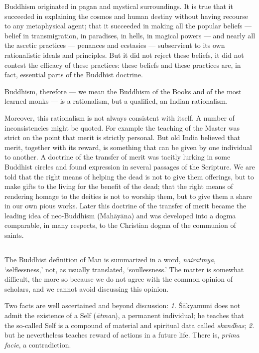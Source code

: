\documentclass[a4paper, 11pt, oneside, english]{article}
\begin{document}
Buddhism originated in pagan and mystical surroundings. It is true that it succeeded in explaining the cosmos and human destiny without having recourse to any metaphysical agent; that it succeeded in making all the popular beliefs --- belief in transmigration, in paradises, in hells, in magical powers --- and nearly all the ascetic practices --- penances and ecstasies --- subservient to its own rationalistic ideals and principles. But it did not reject these beliefs, it did not contest the efficacy of these practices: these beliefs and these practices are, in fact, essential parts of the Buddhist doctrine.

Buddhism, therefore --- we mean the Buddhism of the Books and of the most learned monks --- is a rationalism, but a qualified, an Indian rationalism.

Moreover, this rationalism is not always consistent with itself. A number of inconsistencies might be quoted. For example the teaching of the Master was strict on the point that merit is strictly personal. But old India believed that merit, together with its reward, is something that can be given by one individual to another. A doctrine of the transfer of merit was tacitly lurking in some Buddhist circles and found expression in several passages of the Scripture. We are told that the right means of helping the dead is not to give them offerings, but to make gifts to the living for the benefit of the dead; that the right means of rendering homage to the deities is not to worship them, but to give them a share in our own pious works. Later this doctrine of the transfer of merit became the leading idea of neo-Buddhism (Mahāyāna) and was developed into a dogma comparable, in many respects, to the Christian dogma of the communion of saints.

\subsection{}
\paragraph{}
The Buddhist definition of Man is summarized in a word, \emph{nairātmya}, `selflessness,' not, as usually translated, `soullessness.' The matter is somewhat difficult, the more so because we do not agree with the common opinion of scholars, and we cannot avoid discussing this opinion.

Two facts are well ascertained and beyond discussion: \emph{1.} Śākyamuni does not admit the existence of a Self (\emph{ātman}), a permanent individual; he teaches that the so-called Self is a compound of material and spiritual data called \emph{skandhas}; \emph{2.} but he nevertheless teaches reward of actions in a future life. There is, \emph{prima facie}, a contradiction.
\end{document}
